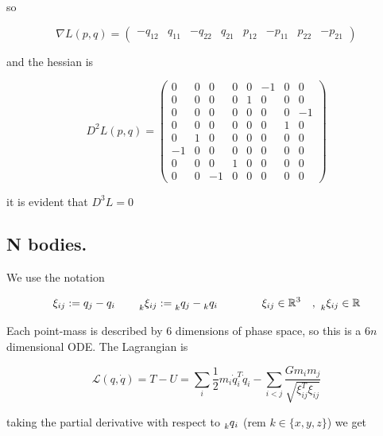 \documentclass[12pt]{article}
\begin{document}
so 

\begin{equation}\label{eq:nabla l kepler}
    \nabla L(p,q) = 
    \begin{pmatrix} 
    -q_{12} & q_{11} & -q_{22} & q_{21} &
    p_{12} & -p_{11} & p_{22} & -p_{21}
    \end{pmatrix}
\end{equation}

and the hessian is

\begin{equation}\label{eq:hessian of angular momentum kepler}
D^2L(p,q) = 
\left(\begin{array}{cccc|cccc}
    0 & 0 & 0 & 0    &    0 & -1 & 0 & 0\\
    0 & 0 & 0 & 0    &    1 & 0 & 0 & 0\\
    0 & 0 & 0 & 0    &    0 & 0 & 0 & -1\\
    0 & 0 & 0 & 0    &    0 & 0 & 1 & 0\\
    \hline
    0 & 1 & 0 & 0    &    0 & 0 & 0 & 0\\
    -1 & 0 & 0 & 0    &    0 & 0 & 0 & 0\\
    0 & 0 & 0 & 1    &    0 & 0 & 0 & 0\\
    0 & 0 & -1 & 0    &    0 & 0 & 0 & 0
\end{array}\right)
\end{equation}

it is evident that $D^3L =0$


\subsection{N bodies.}
We use the notation 

$$
\xi_{ij} := q_j - q_i \qquad \prescript{}{k}{\xi_{ij}} := \prescript{}{k}{q_j} - \prescript{}{k}{q_i} \qquad\qquad \xi_{ij}\in\mathbb{R}^3\quad,\,\, \prescript{}{k}{\xi_{ij}} \in \mathbb{R}
$$

Each point-mass is described by 6 dimensions of phase space, so this is a 6$n$ dimensional ODE. The Lagrangian is 

\begin{equation}\label{eq:lagrangian n bodies}
    \mathcal L(q,\dot q) = T - U = \sum_i \frac{1}{2}m_i \dot q_i^T\dot q_i - \sum_{i<j}\frac{Gm_im_j}{\sqrt{\xi_{ij}^T\xi_{ij}}}
\end{equation}

taking the partial derivative with respect to $\prescript{}{k}{q}_{i}$ (rem $k\in\{x,y,z\}$) we get
\end{document}
